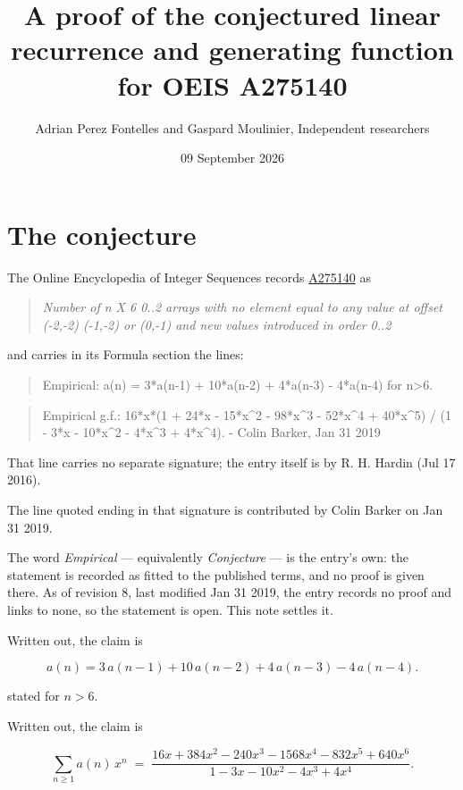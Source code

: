 \documentclass[11pt]{article}
\title{A proof of the conjectured linear recurrence and generating function for OEIS A275140}
\author{Adrian Perez Fontelles and Gaspard Moulinier, Independent researchers}
\date{09 September 2026}
\theoremstyle{definition}
\begin{document}
\maketitle
\section{The conjecture}

The Online Encyclopedia of Integer Sequences records \href{https://oeis.org/A275140}{A275140} as

\begin{quote}\itshape Number of n X 6 0..2 arrays with no element equal to any value at offset (-2,-2) (-1,-2) or (0,-1) and new values introduced in order 0..2\end{quote}

and carries in its Formula section the lines:

\begin{quote}\ttfamily Empirical: a(n) = 3*a(n-1) + 10*a(n-2) + 4*a(n-3) - 4*a(n-4) for n>6.\end{quote}

\begin{quote}\ttfamily Empirical g.f.: 16*x*(1 + 24*x - 15*x\textasciicircum{}2 - 98*x\textasciicircum{}3 - 52*x\textasciicircum{}4 + 40*x\textasciicircum{}5) / (1 - 3*x - 10*x\textasciicircum{}2 - 4*x\textasciicircum{}3 + 4*x\textasciicircum{}4). - Colin Barker, Jan 31 2019\end{quote}

That line carries no separate signature; the entry itself is by R. H. Hardin (Jul 17 2016).

The line quoted ending in that signature is contributed by Colin Barker on Jan 31 2019.

The word {\itshape Empirical} --- equivalently {\itshape Conjecture} --- is the entry's own: the statement is recorded as fitted to the published terms, and no proof is given there. As of revision 8, last modified Jan 31 2019, the entry records no proof and links to none, so the statement is open. This note settles it.

Written out, the claim is

\[a(n) = 3\,a(n-1) + 10\,a(n-2) + 4\,a(n-3) - 4\,a(n-4).\]

stated for $n > 6$.

Written out, the claim is

\[\sum_{n \ge 1} a(n)\,x^n \;=\; \frac{16x + 384x^{2} - 240x^{3} - 1568x^{4} - 832x^{5} + 640x^{6}}{1 - 3x - 10x^{2} - 4x^{3} + 4x^{4}}.\]
\end{document}
